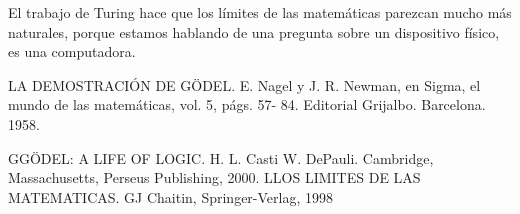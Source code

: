 \documentclass{article}
\begin{document}
El trabajo de Turing hace que los límites de las matemáticas parezcan mucho más naturales, porque estamos hablando de una pregunta sobre un dispositivo físico, es una computadora.


\vspace{2mm} 

\newpage

\begin{thebibliography}{X}
LA DEMOSTRACIÓN DE GÖDEL. E. Nagel y J. R. Newman, en Sigma, el mundo de las matemáticas, vol. 5, págs. 57- 84. Editorial Grijalbo. Barcelona. 1958.


\bibitem GGÖDEL: A LIFE OF LOGIC. H. L. Casti W. DePauli. Cambridge, Massachusetts, Perseus Publishing, 2000.
\bibitem LLOS LIMITES DE LAS MATEMATICAS. GJ Chaitin, Springer-Verlag, 1998


\end{thebibliography}
\end{document}
